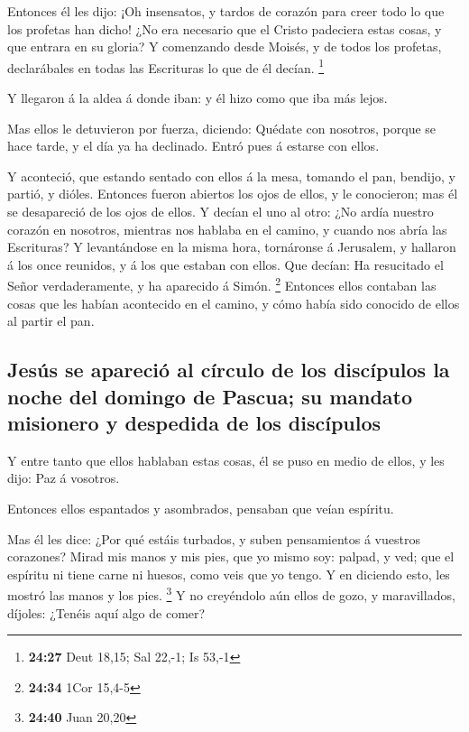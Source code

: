  Entonces él les dijo: ¡Oh insensatos, y tardos de
corazón para creer todo lo que los profetas han dicho! 
¿No era necesario que el Cristo padeciera estas cosas, y que entrara en
su gloria?  Y comenzando desde Moisés, y de todos los
profetas, declarábales en todas las Escrituras lo que de él decían.
\footnote{\textbf{24:27} Deut 18,15; Sal 22,-1; Is 53,-1}

 Y llegaron á la aldea á donde iban: y él hizo como que
iba más lejos.

 Mas ellos le detuvieron por fuerza, diciendo: Quédate
con nosotros, porque se hace tarde, y el día ya ha declinado. Entró pues
á estarse con ellos.

 Y aconteció, que estando sentado con ellos á la mesa,
tomando el pan, bendijo, y partió, y dióles.  Entonces
fueron abiertos los ojos de ellos, y le conocieron; mas él se
desapareció de los ojos de ellos.  Y decían el uno al
otro: ¿No ardía nuestro corazón en nosotros, mientras nos hablaba en el
camino, y cuando nos abría las Escrituras?  Y
levantándose en la misma hora, tornáronse á Jerusalem, y hallaron á los
once reunidos, y á los que estaban con ellos.  Que
decían: Ha resucitado el Señor verdaderamente, y ha aparecido á Simón.
\footnote{\textbf{24:34} 1Cor 15,4-5}  Entonces ellos
contaban las cosas que les habían acontecido en el camino, y cómo había
sido conocido de ellos al partir el pan.

\hypertarget{jesuxfas-se-apareciuxf3-al-cuxedrculo-de-los-discuxedpulos-la-noche-del-domingo-de-pascua-su-mandato-misionero-y-despedida-de-los-discuxedpulos}{%
\subsection{Jesús se apareció al círculo de los discípulos la noche del
domingo de Pascua; su mandato misionero y despedida de los
discípulos}\label{jesuxfas-se-apareciuxf3-al-cuxedrculo-de-los-discuxedpulos-la-noche-del-domingo-de-pascua-su-mandato-misionero-y-despedida-de-los-discuxedpulos}}

 Y entre tanto que ellos hablaban estas cosas, él se puso
en medio de ellos, y les dijo: Paz á vosotros.

 Entonces ellos espantados y asombrados, pensaban que
veían espíritu.

 Mas él les dice: ¿Por qué estáis turbados, y suben
pensamientos á vuestros corazones?  Mirad mis manos y mis
pies, que yo mismo soy: palpad, y ved; que el espíritu ni tiene carne ni
huesos, como veis que yo tengo.  Y en diciendo esto, les
mostró las manos y los pies. \footnote{\textbf{24:40} Juan 20,20}
 Y no creyéndolo aún ellos de gozo, y maravillados,
díjoles: ¿Tenéis aquí algo de comer?

